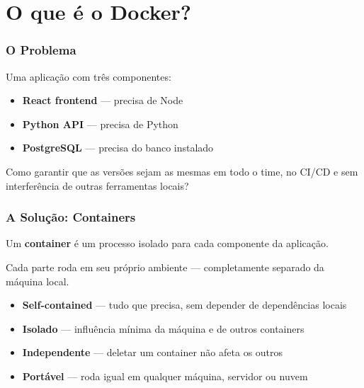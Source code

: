 \section{O que é o Docker?}

\begin{frame}
  \frametitle{O Problema}
  Uma aplicação com três componentes:

  \vspace{0.5em}
  \begin{itemize}
    \item \textbf{React frontend} — precisa de Node
    \item \textbf{Python API} — precisa de Python
    \item \textbf{PostgreSQL} — precisa do banco instalado
  \end{itemize}

  \vspace{0.5em}
  Como garantir que as versões sejam as mesmas em todo o time, no CI/CD
  e sem interferência de outras ferramentas locais?
\end{frame}

\begin{frame}
  \frametitle{A Solução: Containers}
  Um \textbf{container} é um processo isolado para cada componente da aplicação.

  \vspace{0.5em}
  Cada parte roda em seu próprio ambiente — completamente separado da máquina local.

  \vspace{0.5em}
  \begin{itemize}
    \item \textbf{Self-contained} — tudo que precisa, sem depender de dependências locais
    \item \textbf{Isolado} — influência mínima da máquina e de outros containers
    \item \textbf{Independente} — deletar um container não afeta os outros
    \item \textbf{Portável} — roda igual em qualquer máquina, servidor ou nuvem
  \end{itemize}
\end{frame}

